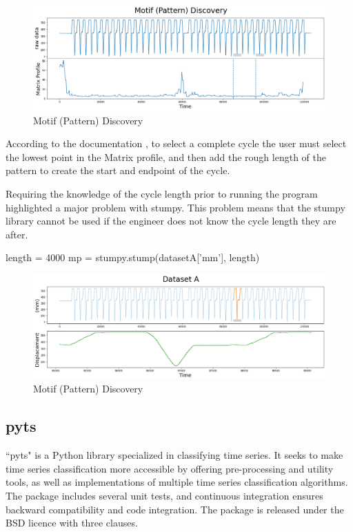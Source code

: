 \begin{figure}
\centering
\includegraphics[scale=0.40]{images/Motif (Pattern) Discovery.png}
\caption{Motif (Pattern) Discovery}
\label{Motif}
\end{figure}
According to the documentation \cite{law2019stumpy}, to select a complete cycle the user must select the lowest point in the Matrix profile, and then add the rough length of the pattern to create the start and endpoint of the cycle.

Requiring the knowledge of the cycle length prior to running the program highlighted a major problem with stumpy. This problem means that the stumpy library cannot be used if the engineer does not know the cycle length they are after. 
\begin{python}
length = 4000
mp = stumpy.stump(datasetA['mm'], length)

\end{python}

\begin{figure}
\centering
\includegraphics[scale=0.40]{images/DatasetA.png}
\caption{Motif (Pattern) Discovery}
\label{Stumpy Cycle selected}
\end{figure}

\subsection{pyts}
``pyts" is a Python library specialized in classifying time series. It seeks to make time series classification more accessible by offering pre-processing and utility tools, as well as implementations of multiple time series classification algorithms. The package includes several unit tests, and continuous integration ensures backward compatibility and code integration. The package is released under the BSD licence with three clauses. \cite{JMLR:v21:19-763}


